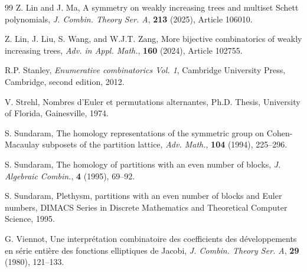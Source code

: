 \documentclass[12pt]{article}
\numberwithin{equation}{section}
\theoremstyle{plain}
\begin{document}
\begin{thebibliography}{99}
 Z. Lin and J. Ma, A symmetry on weakly increasing trees and multiset Schett polynomials, {\it J. Combin. Theory Ser. A}, {\bf213} (2025), Article 106010.

 Z. Lin, J. Liu, S. Wang, and W.J.T. Zang,  More bijective combinatorics of weakly increasing trees, {\it Adv. in Appl. Math.}, {\bf160} (2024), Article 102755.

		  R.P. Stanley, \emph{Enumerative combinatorics Vol. 1}, Cambridge University Press, Cambridge, second edition, 2012.
		 
		 	 V. Strehl, Nombres d'Euler et permutations alternantes, Ph.D. Thesis, University of Florida, Gainesville, 1974.
		
		 S. Sundaram, The homology representations of the symmetric group on Cohen-Macaulay subposets of the partition lattice, \textit{Adv. Math.}, {\bf104} (1994), 225--296.
		
		 S. Sundaram, The homology of partitions with an even number of blocks,  \textit{J. Algebraic Combin.}, \textbf{4} (1995), 69--92.
		
	 S. Sundaram, Plethysm, partitions with an even number of blocks and Euler numbers, DIMACS Series in Discrete Mathematics and Theoretical Computer Science, 1995.
		
 G. Viennot, Une interpr\'etation combinatoire des coefficients des d\'eveloppements en s\'erie enti\`ere des fonctions elliptiques de Jacobi,  \textit{J. Combin. Theory Ser. A}, \textbf{29} (1980), 121--133.
	
	\end{thebibliography}
	
\end{document}
